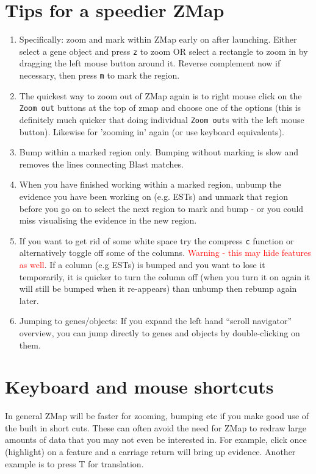 \documentclass[letterpaper]{article}
\begin{document}
\section{Tips for a speedier ZMap}
\begin{enumerate}
\item Specifically: zoom and mark within ZMap early on after launching. Either select a gene object and press \lstinline{z} to zoom OR select a rectangle to zoom in by dragging the left mouse button around it. Reverse complement now if necessary, then press \lstinline{m} to mark the region.
\item The quickest way to zoom out of ZMap again is to right mouse click on the \lstinline{Zoom out} buttons at the top of zmap and choose one of the options (this is definitely much quicker that doing individual \lstinline{Zoom out}s with the left mouse button). Likewise for 'zooming in' again (or use keyboard equivalents).
\item Bump within a marked region only. Bumping without marking is slow and removes the lines connecting Blast matches.
\item When you have finished working within a marked region, unbump the evidence you have been working on (e.g. ESTs) and unmark that region before you go on to select the next region to mark and bump - or you could miss visualising the evidence in the new region.
\item If you want to get rid of some white space try the compress \lstinline{c} function or alternatively toggle off some of the columns. \textcolor{red}{Warning - this may hide features as well}. If a column (e.g ESTs) is bumped and you want to lose it temporarily, it is quicker to turn the column off (when you turn it on again it will still be bumped when it re-appears) than unbump then rebump again later.
\item Jumping to genes/objects: If you expand the left hand ``scroll navigator'' overview, you can jump directly to genes and objects by double-clicking on them.
\end{enumerate}


\clearpage
\section{Keyboard and mouse shortcuts}
In general ZMap will be faster for zooming, bumping etc if you make good use of the built in short cuts. These can often avoid the need for ZMap to redraw large amounts of data that you may not even be interested in. For example, click once (highlight) on a feature and a carriage return will bring up evidence. Another example is to press T for translation.
\end{document}
